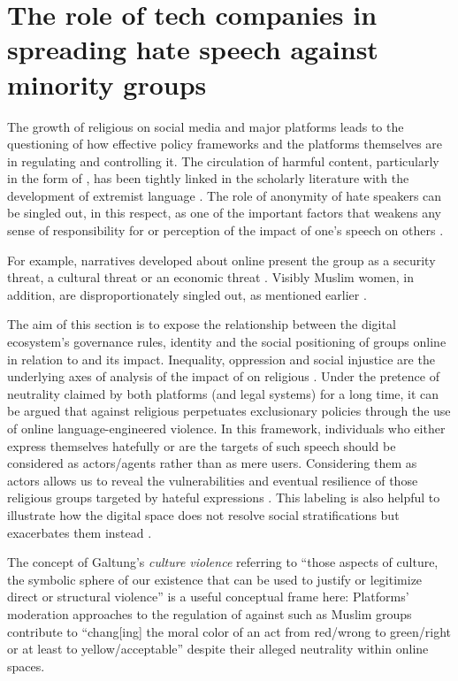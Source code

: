 \documentclass[output=paper,colorlinks,citecolor=brown]{langscibook}
\begin{document}
\section{The role of tech companies in spreading hate speech against minority groups}\label{ch.1.2.ss.3}

The growth of religious  on social media and major platforms leads to the questioning of how effective policy frameworks and the platforms themselves are in regulating and controlling it. The circulation of harmful content, particularly in the form of , has been tightly linked in the scholarly literature with the development of extremist language \citep[1408]{awan_carter_sutch_lally2023}. The role of anonymity of hate speakers can be singled out, in this respect, as one of the important factors that weakens any sense of responsibility for or perception of the impact of one’s speech on others \citep[1408--1409]{awan_carter_sutch_lally2023}.

For example, narratives developed about  online present the group as a security threat, a cultural threat or an economic threat \citep[9]{awan2016}. Visibly Muslim women, in addition, are disproportionately singled out, as mentioned earlier \citep{topidi2024_attacking}. 

The aim of this section is to expose the relationship between the digital ecosystem's governance rules, identity and the social positioning of  groups online in relation to  and its impact. Inequality, oppression and social injustice are the underlying axes of analysis of the impact of  on religious . Under the pretence of neutrality claimed by both platforms (and legal systems) for a long time, it can be argued that  against religious  perpetuates exclusionary policies through the use of online language-engineered violence. In this framework, individuals who either express themselves hatefully or are the targets of such speech should be considered as actors/agents rather than as mere users. Considering them as actors allows us to reveal the vulnerabilities and eventual resilience of those religious  groups targeted by hateful expressions \citep{dale2005}. This labeling is also helpful to illustrate how the digital space does not resolve social stratifications but exacerbates them instead \citep[5]{zheng_walsham2021}.

The concept of Galtung's \textit{culture violence} referring to ``those aspects of culture, the symbolic sphere of our existence that can be used to justify or legitimize direct or structural violence'' \citep[291]{galtung1990} is a useful conceptual frame here: Platforms' moderation approaches to the regulation of  against  such as Muslim groups contribute to ``chang[ing] the moral color of an act from red/wrong to green/right or at least to yellow/acceptable'' \citep[292]{galtung1990} despite their alleged neutrality within online spaces.
\end{document}
